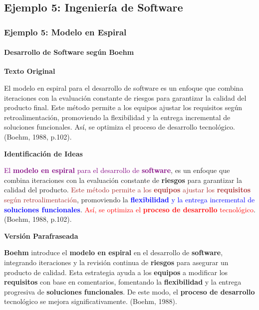 \documentclass[aspectratio=169]{beamer}
\begin{document}
\subsection{Ejemplo 5: Ingeniería de Software}

\begin{frame}[allowframebreaks]
	\frametitle{Ejemplo 5: Modelo en Espiral}
	\framesubtitle{Desarrollo de Software según Boehm}
	
	\textbf{Texto Original}
	\begin{block}{}
		\small
		El modelo en espiral para el desarrollo de software es un enfoque que combina iteraciones con la evaluación constante de riesgos para garantizar la calidad del producto final. Este método permite a los equipos ajustar los requisitos según retroalimentación, promoviendo la flexibilidad y la entrega incremental de soluciones funcionales. Así, se optimiza el proceso de desarrollo tecnológico. (Boehm, 1988, p.102).
	\end{block}
	
	\framebreak
	
	\textbf{Identificación de Ideas}
	\begin{block}{}
		\small
		\textcolor{purple}{El \textbf{modelo en espiral} para el desarrollo de \textbf{software}}, es un enfoque que combina iteraciones con la evaluación constante de \textbf{riesgos} para garantizar la calidad del producto. \textcolor{brown}{Este método permite a los \textbf{equipos} ajustar los \textbf{requisitos} según retroalimentación}, promoviendo la \textcolor{blue}{\textbf{flexibilidad} y la entrega incremental de \textbf{soluciones funcionales}}. \textcolor{red}{Así, se optimiza el \textbf{proceso de desarrollo} tecnológico}. (Boehm, 1988, p.102).
	\end{block}
	
	\framebreak
	
	\textbf{Versión Parafraseada}
	\begin{block}{}
		\small
		\textbf{Boehm} introduce el \textbf{modelo en espiral} en el desarrollo de \textbf{software}, integrando iteraciones y la revisión continua de \textbf{riesgos} para asegurar un producto de calidad. Esta estrategia ayuda a los \textbf{equipos} a modificar los \textbf{requisitos} con base en comentarios, fomentando la \textbf{flexibilidad} y la entrega progresiva de \textbf{soluciones funcionales}. De este modo, el \textbf{proceso de desarrollo} tecnológico se mejora significativamente. (Boehm, 1988).
	\end{block}
\end{frame}
\end{document}
